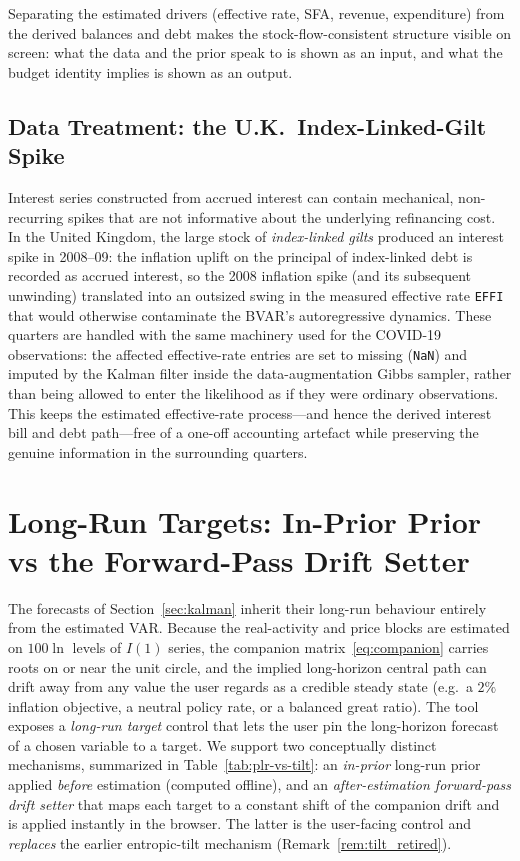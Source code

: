 \documentclass[11pt]{article}
\theoremstyle{definition}
\theoremstyle{remark}
\begin{document}
Separating the estimated drivers (effective rate, SFA, revenue, expenditure)
from the derived balances and debt makes the stock-flow-consistent structure
visible on screen: what the data and the prior speak to is shown as an
input, and what the budget identity implies is shown as an output.

\subsection{Data Treatment: the U.K.\ Index-Linked-Gilt Spike}\label{sec:fiscal_data}

Interest series constructed from accrued interest can contain
mechanical, non-recurring spikes that are not informative about the
underlying refinancing cost.  In the United Kingdom, the large stock of
\emph{index-linked gilts} produced an interest spike in 2008--09:
the inflation uplift on the principal of index-linked debt is recorded as
accrued interest, so the 2008 inflation spike (and its subsequent
unwinding) translated into an outsized swing in the measured effective rate
\texttt{EFFI} that would otherwise contaminate the BVAR's autoregressive
dynamics.  These quarters are handled with the same machinery used for
the COVID-19 observations: the affected effective-rate entries are set to
missing (\texttt{NaN}) and imputed by the Kalman filter inside the
data-augmentation Gibbs sampler, rather than being allowed to enter the
likelihood as if they were ordinary observations.  This keeps the
estimated effective-rate process---and hence the derived interest bill
and debt path---free of a one-off accounting artefact while preserving
the genuine information in the surrounding quarters.

\section{Long-Run Targets: In-Prior Prior vs the Forward-Pass Drift Setter}\label{sec:longrun}

The forecasts of Section~\ref{sec:kalman} inherit their long-run
behaviour entirely from the estimated VAR. Because the real-activity
and price blocks are estimated on $100\ln$ levels of $I(1)$ series, the
companion matrix~\eqref{eq:companion} carries roots on or near the unit
circle, and the implied long-horizon central path can drift away from
any value the user regards as a credible steady state (e.g.\ a $2\%$
inflation objective, a neutral policy rate, or a balanced great ratio).
The tool exposes a \emph{long-run target} control that lets the user
pin the long-horizon forecast of a chosen variable to a target. We
support two conceptually distinct mechanisms, summarized in
Table~\ref{tab:plr-vs-tilt}: an \emph{in-prior} long-run prior applied
\emph{before} estimation (computed offline), and an
\emph{after-estimation forward-pass drift setter} that maps each target
to a constant shift of the companion drift and is applied instantly in
the browser. The latter is the user-facing control and \emph{replaces}
the earlier entropic-tilt mechanism (Remark~\ref{rem:tilt_retired}).
\end{document}
